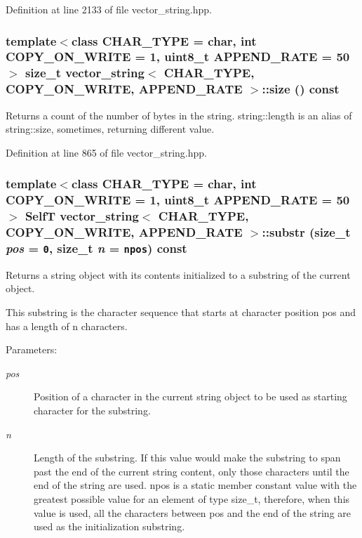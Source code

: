 Definition at line 2133 of file vector\_\-string.hpp.\hypertarget{classvector__string_04d1b575101326449857d05ac08b0f79}{
\subsubsection[{size}]{\setlength{\rightskip}{0pt plus 5cm}template$<$class CHAR\_\-TYPE  = char, int COPY\_\-ON\_\-WRITE = 1, uint8\_\-t APPEND\_\-RATE = 50$>$ size\_\-t {\bf vector\_\-string}$<$ CHAR\_\-TYPE, COPY\_\-ON\_\-WRITE, APPEND\_\-RATE $>$::size () const}}
\label{classvector__string_04d1b575101326449857d05ac08b0f79}


Returns a count of the number of bytes in the string. string::length is an alias of string::size, sometimes, returning different value. 

Definition at line 865 of file vector\_\-string.hpp.\hypertarget{classvector__string_0d46d44039a39232b4c3611920a43653}{
\subsubsection[{substr}]{\setlength{\rightskip}{0pt plus 5cm}template$<$class CHAR\_\-TYPE  = char, int COPY\_\-ON\_\-WRITE = 1, uint8\_\-t APPEND\_\-RATE = 50$>$ {\bf SelfT} {\bf vector\_\-string}$<$ CHAR\_\-TYPE, COPY\_\-ON\_\-WRITE, APPEND\_\-RATE $>$::substr (size\_\-t {\em pos} = {\tt 0}, \/  size\_\-t {\em n} = {\tt {\bf npos}}) const}}
\label{classvector__string_0d46d44039a39232b4c3611920a43653}


Returns a string object with its contents initialized to a substring of the current object.

This substring is the character sequence that starts at character position pos and has a length of n characters.

\begin{Desc}
\item[Parameters:]
\begin{description}
\item[{\em pos}]Position of a character in the current string object to be used as starting character for the substring. \item[{\em n}]Length of the substring. If this value would make the substring to span past the end of the current string content, only those characters until the end of the string are used. npos is a static member constant value with the greatest possible value for an element of type size\_\-t, therefore, when this value is used, all the characters between pos and the end of the string are used as the initialization substring. \end{description}
\end{Desc}


